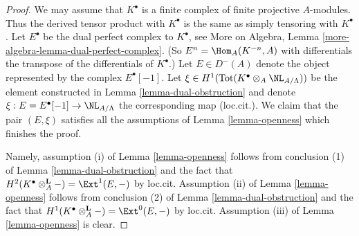 \begin{proof}
We may assume that $K^\bullet$ is a finite complex of finite projective
$A$-modules. Thus the derived tensor product with $K^\bullet$ is the
same as simply tensoring with $K^\bullet$. Let
$E^\bullet$ be the dual perfect complex to $K^\bullet$, see
More on Algebra, Lemma \ref{more-algebra-lemma-dual-perfect-complex}.
(So $E^n = \Hom_A(K^{-n}, A)$ with differentials the transpose of the
differentials of $K^\bullet$.) Let $E \in D^{-}(A)$ denote the
object represented by the complex $E^\bullet[-1]$.
Let $\xi \in H^1(\text{Tot}(K^\bullet \otimes_A \NL_{A/\Lambda}))$
be the element constructed in Lemma \ref{lemma-dual-obstruction}
and denote $\xi : E = E^\bullet[-1] \to \NL_{A/\Lambda}$ the corresponding
map (loc.cit.). We claim that the pair $(E, \xi)$ satisfies all the
assumptions of Lemma \ref{lemma-openness} which finishes the proof.

\medskip\noindent
Namely, assumption (i) of Lemma \ref{lemma-openness} follows from conclusion
(1) of Lemma \ref{lemma-dual-obstruction}
and the fact that $H^2(K^\bullet \otimes_A^\mathbf{L} -) =
\Ext^1(E, -)$ by loc.cit. Assumption (ii) of
Lemma \ref{lemma-openness} follows from conclusion (2) of
Lemma \ref{lemma-dual-obstruction}
and the fact that $H^1(K^\bullet \otimes_A^\mathbf{L} -) =
\Ext^0(E, -)$ by loc.cit. Assumption (iii) of Lemma \ref{lemma-openness}
is clear.
\end{proof}






















